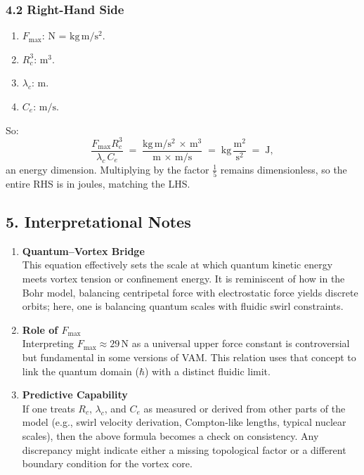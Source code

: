 \documentclass[aps,preprint,superscriptaddress]{revtex4-2}
\begin{document}
    \subsubsection*{4.2 Right-Hand Side}
    \begin{enumerate}
        \item \(F_{\max}\): \(\mathrm{N}\) = \(\mathrm{kg\,m/s^2}\).
        \item \(R_c^3\): \(\mathrm{m^3}\).
        \item \(\lambda_c\): \(\mathrm{m}\).
        \item \(C_e\): \(\mathrm{m/s}\).
    \end{enumerate}

    So:
    \[
        \frac{F_{\max} R_c^3}{\lambda_c\,C_e}
        \;=\;
        \frac{\mathrm{kg\,m/s^2}\,\times\,\mathrm{m^3}}{\mathrm{m}\,\times\,\mathrm{m/s}}
        \;=\;
        \mathrm{kg}\,\frac{\mathrm{m^2}}{\mathrm{s^2}}
        \;=\;
        \mathrm{J},
    \]
    an energy dimension. Multiplying by the factor \(\tfrac{1}{5}\) remains dimensionless, so the entire RHS is in joules, matching the LHS.

    \subsection*{5. Interpretational Notes}

    \begin{enumerate}
        \item \textbf{Quantum–Vortex Bridge} \\
    This equation effectively sets the scale at which quantum kinetic energy meets vortex tension or confinement energy. It is reminiscent of how in the Bohr model, balancing centripetal force with electrostatic force yields discrete orbits; here, one is balancing quantum scales with fluidic swirl constraints.
        \item \textbf{Role of \(F_{\max}\)} \\
    Interpreting \(F_{\max}\approx 29\,\mathrm{N}\) as a universal upper force constant is controversial but fundamental in some versions of VAM. This relation uses that concept to link the quantum domain (\(\hbar\)) with a distinct fluidic limit.
        \item \textbf{Predictive Capability} \\
    If one treats \(R_c\), \(\lambda_c\), and \(C_e\) as measured or derived from other parts of the model (e.g., swirl velocity derivation, Compton-like lengths, typical nuclear scales), then the above formula becomes a check on consistency. Any discrepancy might indicate either a missing topological factor or a different boundary condition for the vortex core.
    \end{enumerate}
\end{document}
